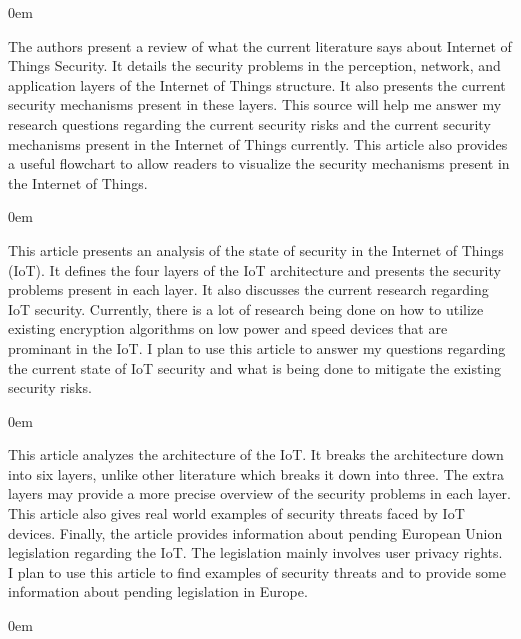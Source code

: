 \documentclass{article}
\newenvironment{annotation}{\begin{addmargin}[2.5em]{0em} \begin{flushleft}}{\end{flushleft} \end{addmargin}}
\begin{document}
\begin{annotation}
The authors present a review of what the current literature says about Internet of Things Security. 
It details the security problems in the perception, network, and application layers of the Internet of Things structure. 
It also presents the current security mechanisms present in these layers. 
This source will help me answer my research questions regarding the current security risks and the current security mechanisms present in the Internet of Things currently.
This article also provides a useful flowchart to allow readers to visualize the security mechanisms present in the Internet of Things.  
\end{annotation}

\begin{annotation}
This article presents an analysis of the state of security in the Internet of Things (IoT). It defines the four layers of the IoT architecture and presents the security
problems present in each layer. It also discusses the current research regarding IoT security. Currently, there is a lot of research being done on how to utilize existing
encryption algorithms on low power and speed devices that are prominant in the IoT. I plan to use this article to answer my questions regarding the current state of IoT
security and what is being done to mitigate the existing security risks. 
\end{annotation}

\begin{annotation}
This article analyzes the architecture of the IoT. It breaks the architecture down into six layers, unlike other literature which breaks it down into three. The extra layers may provide a more precise overview of the security problems in each layer. This article also gives real world examples of security threats faced by IoT devices. Finally, the article provides information about pending European Union legislation regarding the IoT. The legislation mainly involves user privacy rights. I plan to use this article to find examples of security threats and to provide some information about pending legislation in Europe. 
\end{annotation}

\begin{annotation}

\end{annotation}
\end{document}
